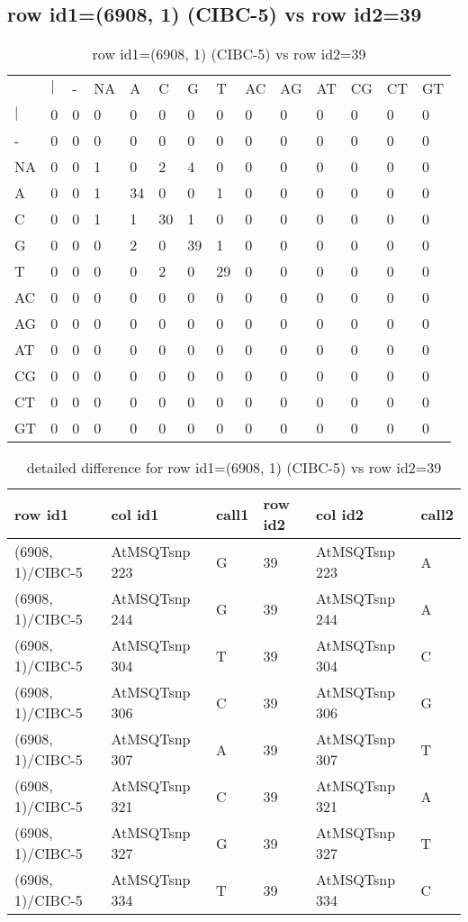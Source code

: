 \subsection{row id1=(6908, 1) (CIBC-5) vs row id2=39}
\begin{center}
\begin{longtable}{|l|l|l|l|l|l|l|l|l|l|l|l|l|l|}
\caption{row id1=(6908, 1) (CIBC-5) vs row id2=39} \label{table_dm78}\\
\hline
\\
\hline
&$|$&-&NA&A&C&G&T&AC&AG&AT&CG&CT&GT\\
$|$&0&0&0&0&0&0&0&0&0&0&0&0&0\\
-&0&0&0&0&0&0&0&0&0&0&0&0&0\\
NA&0&0&1&0&2&4&0&0&0&0&0&0&0\\
A&0&0&1&34&0&0&1&0&0&0&0&0&0\\
C&0&0&1&1&30&1&0&0&0&0&0&0&0\\
G&0&0&0&2&0&39&1&0&0&0&0&0&0\\
T&0&0&0&0&2&0&29&0&0&0&0&0&0\\
AC&0&0&0&0&0&0&0&0&0&0&0&0&0\\
AG&0&0&0&0&0&0&0&0&0&0&0&0&0\\
AT&0&0&0&0&0&0&0&0&0&0&0&0&0\\
CG&0&0&0&0&0&0&0&0&0&0&0&0&0\\
CT&0&0&0&0&0&0&0&0&0&0&0&0&0\\
GT&0&0&0&0&0&0&0&0&0&0&0&0&0\\
\hline
\end{longtable}
\end{center}

\begin{center}
\begin{longtable}{|l|l|l|l|l|l|}
\caption{detailed difference for row id1=(6908, 1) (CIBC-5) vs row id2=39} \label{table_dm79}\\
\hline
row id1&col id1&call1&row id2&col id2&call2\\
\hline
(6908, 1)/CIBC-5&AtMSQTsnp 223&G&39&AtMSQTsnp 223&A\\
(6908, 1)/CIBC-5&AtMSQTsnp 244&G&39&AtMSQTsnp 244&A\\
(6908, 1)/CIBC-5&AtMSQTsnp 304&T&39&AtMSQTsnp 304&C\\
(6908, 1)/CIBC-5&AtMSQTsnp 306&C&39&AtMSQTsnp 306&G\\
(6908, 1)/CIBC-5&AtMSQTsnp 307&A&39&AtMSQTsnp 307&T\\
(6908, 1)/CIBC-5&AtMSQTsnp 321&C&39&AtMSQTsnp 321&A\\
(6908, 1)/CIBC-5&AtMSQTsnp 327&G&39&AtMSQTsnp 327&T\\
(6908, 1)/CIBC-5&AtMSQTsnp 334&T&39&AtMSQTsnp 334&C\\
\hline
\end{longtable}
\end{center}

